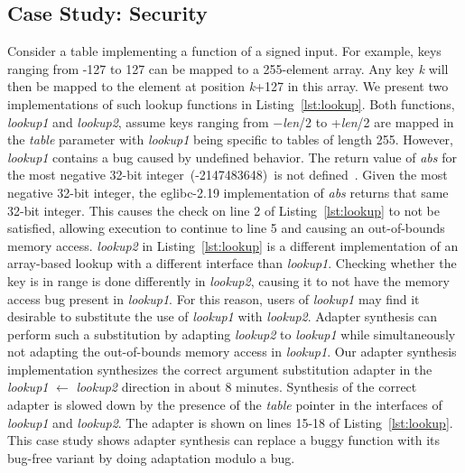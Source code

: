 \subsection{Case Study: Security}\label{subsec:case-study-security}
%

%
%
%
%
%
%
Consider a table implementing a function of a signed input.
%
For example, keys ranging from -127 to 127 can be mapped to a 255-element array.
%
Any key \textit{k} will then be mapped to the element at position \textit{k}+127 in this array.
%
We present two implementations of such lookup functions in Listing~\ref{lst:lookup}.
%
Both functions, \textit{lookup1} and \textit{lookup2}, assume keys ranging from $-$\textit{len}/2 to +\textit{len}/2 are mapped in the \textit{table} parameter with \textit{lookup1} being specific to tables of length 255.
%
However, \textit{lookup1} contains a bug caused by undefined behavior.
%
The return value of \textit{abs} for the most negative 32-bit integer~(-2147483648)~is not defined~\cite{gnu-abs}.
%
Given the most negative 32-bit integer, the eglibc-2.19 implementation of \textit{abs} returns that same 32-bit integer.
%
This causes the check on line 2 of Listing~\ref{lst:lookup} to not be satisfied, allowing execution to continue to line 5 and causing an out-of-bounds memory access.
%
\textit{lookup2} in Listing~\ref{lst:lookup} is a different implementation of an array-based lookup with a different interface than \textit{lookup1}.
%
Checking whether the key is in range is done differently in \textit{lookup2}, causing it to not have the memory access bug present in \textit{lookup1}.
%
For this reason, users of \textit{lookup1} may find it desirable to substitute the use of \textit{lookup1} with \textit{lookup2}.
%
Adapter synthesis can perform such a substitution by adapting \textit{lookup2} to \textit{lookup1} while simultaneously not adapting the out-of-bounds memory access in \textit{lookup1}.
%
Our adapter synthesis implementation synthesizes the correct argument substitution adapter in the \textit{lookup1} $\leftarrow$ \textit{lookup2} direction in about 8 minutes.
%
Synthesis of the correct adapter is slowed down by the presence of the \textit{table} pointer in the interfaces of \textit{lookup1} and \textit{lookup2}.
%
The adapter is shown on lines 15-18 of Listing~\ref{lst:lookup}.
%
This case study shows adapter synthesis can replace a buggy function
with its bug-free variant by doing adaptation modulo a bug.
%
